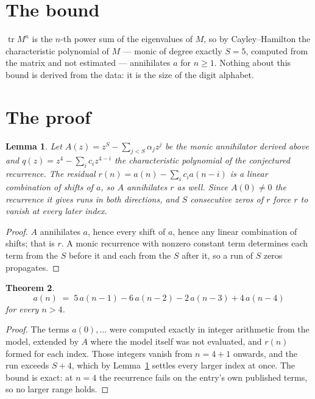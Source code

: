 \documentclass[11pt,a4paper]{article}
\theoremstyle{plain}
\newtheorem{theorem}{Theorem}
\newtheorem{lemma}[theorem]{Lemma}
\theoremstyle{definition}
\begin{document}
\section{The bound}

$\operatorname{tr}M^{n}$ is the $n$-th power sum of the eigenvalues of $M$, so by
Cayley--Hamilton the characteristic polynomial of $M$ --- monic of degree exactly $S=5$,
computed from the matrix and not estimated --- annihilates $a$ for $n\ge1$. Nothing about this
bound is derived from the data: it is the size of the digit alphabet.

\section{The proof}

\begin{lemma}\label{lem:crit}
Let $A(z)=z^S-\sum_{j<S}\alpha_jz^{j}$ be the monic annihilator derived above and
$q(z)=z^{4}-\sum_ic_iz^{4-i}$ the characteristic polynomial of the conjectured
recurrence. The residual $r(n)=a(n)-\sum_ic_ia(n-i)$ is a linear combination of shifts of $a$,
so $A$ annihilates $r$ as well. Since $A(0)\ne0$ the recurrence it gives runs in both
directions, and $S$ consecutive zeros of $r$ force $r$ to vanish at every later index.
\end{lemma}

\begin{proof}
$A$ annihilates $a$, hence every shift of $a$, hence any linear combination of shifts; that is
$r$. A monic recurrence with nonzero constant term determines each term from the $S$ before it
and each from the $S$ after it, so a run of $S$ zeros propagates.
\end{proof}

\begin{theorem}
\[
a(n)\;=\;5\,a(n-1) - 6\,a(n-2) - 2\,a(n-3) + 4\,a(n-4)
\]
for every $n>4$.
\end{theorem}

\begin{proof}
The terms $a(0),\dots$ were computed exactly in integer arithmetic from the model, extended by
$A$ where the model itself was not evaluated, and $r(n)$ formed for each index. Those integers
vanish from $n=4+1$ onwards, and the run exceeds $S+4$, which by
Lemma~\ref{lem:crit} settles every larger index at once. The bound is exact: at $n=4$ the recurrence fails on the entry's own published terms, so no larger range holds.
\end{proof}
\end{document}
